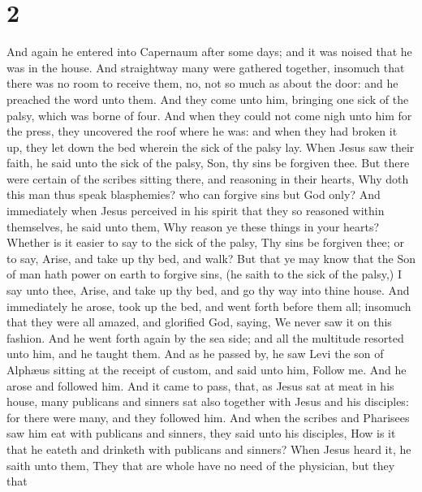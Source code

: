 \hypertarget{section-1}{%
\section{2}\label{section-1}}

 And again he entered into Capernaum after some days; and it
was noised that he was in the house.  And straightway many
were gathered together, insomuch that there was no room to receive them,
no, not so much as about the door: and he preached the word unto them.
 And they come unto him, bringing one sick of the palsy,
which was borne of four.  And when they could not come nigh
unto him for the press, they uncovered the roof where he was: and when
they had broken it up, they let down the bed wherein the sick of the
palsy lay.  When Jesus saw their faith, he said unto the
sick of the palsy, Son, thy sins be forgiven thee.  But
there were certain of the scribes sitting there, and reasoning in their
hearts,  Why doth this man thus speak blasphemies? who can
forgive sins but God only?  And immediately when Jesus
perceived in his spirit that they so reasoned within themselves, he said
unto them, Why reason ye these things in your hearts? 
Whether is it easier to say to the sick of the palsy, Thy sins be
forgiven thee; or to say, Arise, and take up thy bed, and walk?
 But that ye may know that the Son of man hath power on
earth to forgive sins, (he saith to the sick of the palsy,)
 I say unto thee, Arise, and take up thy bed, and go thy
way into thine house.  And immediately he arose, took up
the bed, and went forth before them all; insomuch that they were all
amazed, and glorified God, saying, We never saw it on this fashion.
 And he went forth again by the sea side; and all the
multitude resorted unto him, and he taught them.  And as he
passed by, he saw Levi the son of Alphæus sitting at the receipt of
custom, and said unto him, Follow me. And he arose and followed him.
 And it came to pass, that, as Jesus sat at meat in his
house, many publicans and sinners sat also together with Jesus and his
disciples: for there were many, and they followed him.  And
when the scribes and Pharisees saw him eat with publicans and sinners,
they said unto his disciples, How is it that he eateth and drinketh with
publicans and sinners?  When Jesus heard it, he saith unto
them, They that are whole have no need of the physician, but they that
